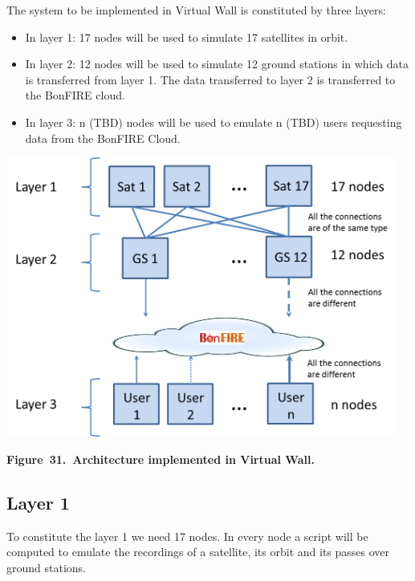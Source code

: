 \documentclass[a4paper]{article}
\newcommand\liststyleLFOxxxvi{%
\renewcommand\labelitemi{[F0B7?]}
\renewcommand\labelitemii{o}
\renewcommand\labelitemiii{[F0A7?]}
\renewcommand\labelitemiv{[F0B7?]}
}
\begin{document}
The system to be implemented in Virtual Wall is constituted by three
layers:

\liststyleLFOxxxvi
\begin{itemize}
\item In layer 1: 17 nodes will be used to simulate 17 satellites in
orbit.
\item In layer 2: 12 nodes will be used to simulate 12 ground stations
in which data is transferred from layer 1. The data transferred to
layer 2 is transferred to the BonFIRE cloud.
\item In layer 3: n (TBD) nodes will be used to emulate n (TBD) users
requesting data from the BonFIRE Cloud.
\end{itemize}

\bigskip


\bigskip

{\centering 
\includegraphics[width=5.06254in,height=3.62798in]{out-img39.png} \par}

{\centering\bfseries
Figure\ 31.\ Architecture implemented in Virtual Wall.
\par}


\bigskip


\bigskip

\subsection[Layer 1]{Layer 1}
\hypertarget{Toc381777231}{}
\bigskip

To constitute the layer 1 we need 17 nodes. In every node a script will
be computed to emulate the recordings of a satellite, its orbit and its
passes over ground stations.
\end{document}
